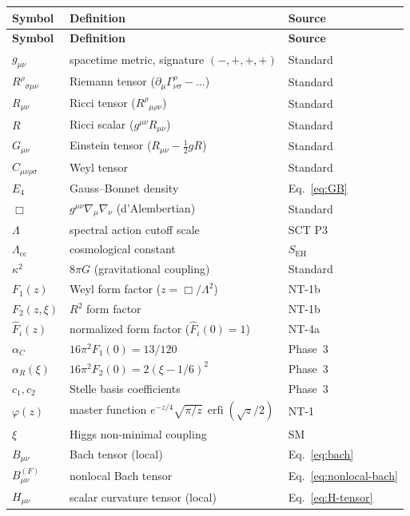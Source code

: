 \documentclass[12pt,a4paper]{article}
\theoremstyle{definition}
\theoremstyle{remark}
\newcommand{\erfi}{\operatorname{erfi}}
\begin{document}
\begin{center}
\renewcommand{\arraystretch}{1.3}
\begin{longtable}{lll}
\toprule
\textbf{Symbol} & \textbf{Definition} & \textbf{Source} \\
\midrule
\endfirsthead
\toprule
\textbf{Symbol} & \textbf{Definition} & \textbf{Source} \\
\midrule
\endhead
$g_{\mu\nu}$ & spacetime metric, signature $(-,+,+,+)$ & Standard \\
$R^\rho{}_{\sigma\mu\nu}$ & Riemann tensor
  ($\partial_\mu\Gamma^\rho_{\nu\sigma} - \ldots$) & Standard \\
$R_{\mu\nu}$ & Ricci tensor ($R^\rho{}_{\mu\rho\nu}$) & Standard \\
$R$ & Ricci scalar ($g^{\mu\nu}R_{\mu\nu}$) & Standard \\
$G_{\mu\nu}$ & Einstein tensor ($R_{\mu\nu} - \frac{1}{2}gR$) & Standard \\
$C_{\mu\nu\rho\sigma}$ & Weyl tensor & Standard \\
$E_4$ & Gauss--Bonnet density & Eq.~\eqref{eq:GB} \\
$\Box$ & $g^{\mu\nu}\nabla_\mu\nabla_\nu$ (d'Alembertian) & Standard \\
$\Lambda$ & spectral action cutoff scale & SCT P3 \\
$\Lambda_{\mathrm{cc}}$ & cosmological constant & $S_{\mathrm{EH}}$ \\
$\kappa^2$ & $8\pi G$ (gravitational coupling) & Standard \\
$F_1(z)$ & Weyl form factor ($z = \Box/\Lambda^2$) & NT-1b \\
$F_2(z,\xi)$ & $R^2$ form factor & NT-1b \\
$\hat{F}_i(z)$ & normalized form factor ($\hat{F}_i(0)=1$) & NT-4a \\
$\alpha_C$ & $16\pi^2 F_1(0) = 13/120$ & Phase~3 \\
$\alpha_R(\xi)$ & $16\pi^2 F_2(0) = 2(\xi-1/6)^2$ & Phase~3 \\
$c_1, c_2$ & Stelle basis coefficients & Phase~3 \\
$\varphi(z)$ & master function
  $e^{-z/4}\sqrt{\pi/z}\,\erfi(\sqrt{z}/2)$ & NT-1 \\
$\xi$ & Higgs non-minimal coupling & SM \\
$B_{\mu\nu}$ & Bach tensor (local) & Eq.~\eqref{eq:bach} \\
$B_{\mu\nu}^{(F)}$ & nonlocal Bach tensor & Eq.~\eqref{eq:nonlocal-bach} \\
$H_{\mu\nu}$ & scalar curvature tensor (local) & Eq.~\eqref{eq:H-tensor} \\

\end{longtable}
\end{center}
\end{document}
